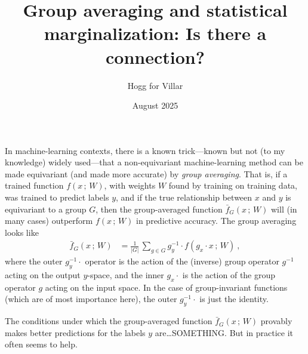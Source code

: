 \documentclass{article}
\title{\bfseries%
Group averaging and statistical marginalization:
Is there a connection?}
\author{Hogg for Villar}
\date{August 2025}
\newcommand{\semic}{\,;\,}
\begin{document}
\maketitle

In machine-learning contexts, there is a known trick---known but not (to my knowledge) widely used---that a non-equivariant machine-learning method can be made equivariant (and made more accurate) by \emph{group averaging}.
That is, if a trained function $f(x\semic W)$, with weights $W$ found by training on training data, was trained to predict labels $y$, and if the true relationship between $x$ and $y$ is equivariant to a group $G$, then the group-averaged function $\bar{f}_G(x\semic W)$ will (in many cases) outperform $f(x\semic W)$ in predictive accuracy.
The group averaging looks like
\begin{align}
    \bar{f}_G(x\semic W) &= \frac{1}{|G|}\,\sum_{g\in G} g_y^{-1}\cdot f(g_x\cdot x\semic W) ~,
\end{align}
where the outer $g_y^{-1}\cdot$ operator is the action of the (inverse) group operator $g^{-1}$ acting on the output $y$-space, and the inner $g_x\cdot$ is the action of the group operator $g$ acting on the input space.
In the case of group-invariant functions (which are of most importance here), the outer $g_y^{-1}\cdot$ is just the identity.

The conditions under which the group-averaged function $\bar{f}_G(x\semic W)$ provably makes better predictions for the labels $y$ are\ldots SOMETHING.
But in practice it often seems to help.
\end{document}
